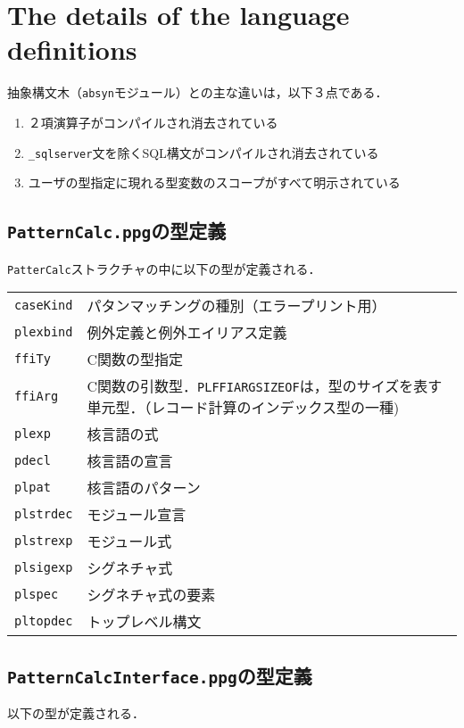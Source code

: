 \documentclass{jbook}
\newif\ifjp
\newcommand{\txt}[2]{#2}
\newcommand{\code}[1]{\mbox{\large\tt #1}}
\begin{document}
\section{\txt{中間言語定義の詳細}{The details of the language definitions}}
\ifjp%
	抽象構文木（\code{absyn}モジュール）との主な違いは，以下３点である．
\begin{enumerate}
\item ２項演算子がコンパイルされ消去されている
\item \code{\_sqlserver}文を除くSQL構文がコンパイルされ消去されている
\item ユーザの型指定に現れる型変数のスコープがすべて明示されている
\end{enumerate}

\subsection{\code{PatternCalc.ppg}の型定義}
	\code{PatterCalc}ストラクチャの中に以下の型が定義される．

\begin{tabular}{ll}
\code{caseKind} & パタンマッチングの種別（エラープリント用）
\\
\code{plexbind} & 例外定義と例外エイリアス定義
\\
\code{ffiTy} & C関数の型指定
\\
\code{ffiArg} & C関数の引数型．\code{PLFFIARGSIZEOF}は，型のサイズを表す
単元型．（レコード計算のインデックス型の一種)
\\
\code{plexp} & 核言語の式
\\
\code{pdecl} & 核言語の宣言
\\
\code{plpat} & 核言語のパターン
\\
\code{plstrdec} & モジュール宣言
\\
\code{plstrexp} & モジュール式
\\
\code{plsigexp} & シグネチャ式
\\
\code{plspec} & シグネチャ式の要素
\\
\code{pltopdec} & トップレベル構文
\end{tabular}

\subsection{\code{PatternCalcInterface.ppg}の型定義}
	以下の型が定義される．
\end{document}

